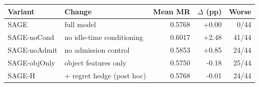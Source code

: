 \begin{tabular}{llrrr}
\toprule
Variant & Change & Mean MR & $\Delta$ (pp) & Worse \\
\midrule
SAGE & full model & 0.5768 & +0.00 & 0/44 \\
SAGE-noCond & no idle-time conditioning & 0.6017 & +2.48 & 41/44 \\
SAGE-noAdmit & no admission control & 0.5853 & +0.85 & 24/44 \\
SAGE-objOnly & object features only & 0.5750 & -0.18 & 25/44 \\
SAGE-H & + regret hedge (post hoc) & 0.5768 & -0.01 & 24/44 \\
\bottomrule
\end{tabular}

